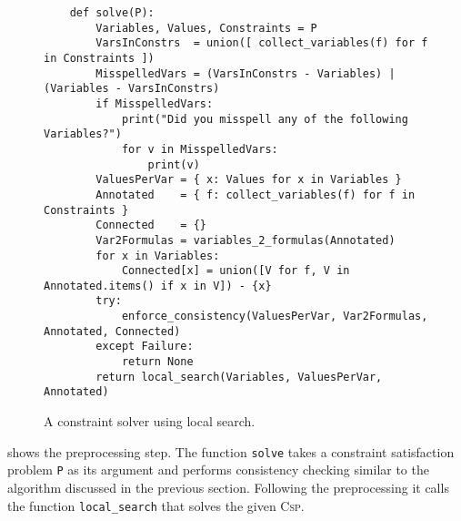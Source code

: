 \begin{figure}[!ht]
\centering
\begin{verbatim}
    def solve(P):
        Variables, Values, Constraints = P
        VarsInConstrs  = union([ collect_variables(f) for f in Constraints ])
        MisspelledVars = (VarsInConstrs - Variables) | (Variables - VarsInConstrs)
        if MisspelledVars:
            print("Did you misspell any of the following Variables?")
            for v in MisspelledVars:
                print(v)
        ValuesPerVar = { x: Values for x in Variables }
        Annotated    = { f: collect_variables(f) for f in Constraints }
        Connected    = {}
        Var2Formulas = variables_2_formulas(Annotated)
        for x in Variables:
            Connected[x] = union([V for f, V in Annotated.items() if x in V]) - {x}
        try:
            enforce_consistency(ValuesPerVar, Var2Formulas, Annotated, Connected)
        except Failure:
            return None
        return local_search(Variables, ValuesPerVar, Annotated)
\end{verbatim}
\vspace*{-0.3cm}
\caption{A constraint solver using local search.}
\label{fig:Local-Search.ipynb:solve}
\end{figure}

 shows the preprocessing step.  The function \texttt{solve} takes a constraint
satisfaction problem \texttt{P} as its argument and performs consistency checking similar to the algorithm
discussed in the previous section.  Following the preprocessing it calls the function \texttt{local\_search}
that solves the given \textsc{Csp}.

